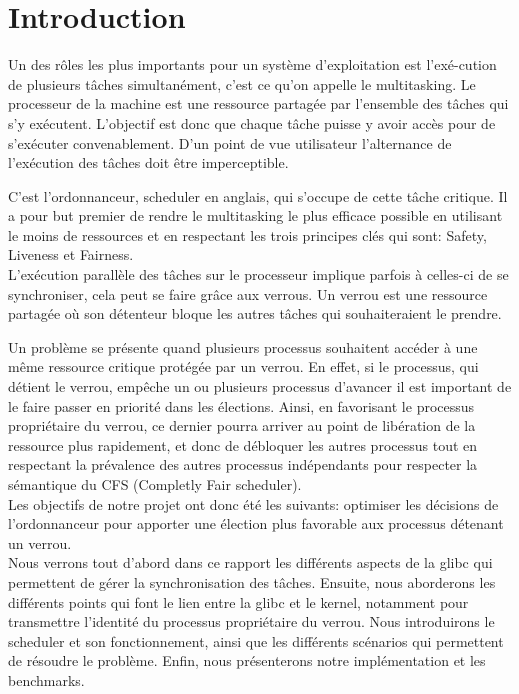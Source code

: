 \section{Introduction}

Un des rôles les plus importants pour un système d'exploitation est
l'exé-cution de plusieurs tâches simultanément, c'est ce qu'on
appelle le multitasking. Le processeur de la machine est une ressource
partagée par l'ensemble des tâches qui s'y exécutent. L'objectif est donc
que chaque tâche puisse y avoir accès pour de s'exécuter 
convenablement. D'un point de vue utilisateur l'alternance de l'exécution
des tâches doit être imperceptible.

C'est l'ordonnanceur, scheduler en anglais, qui s'occupe de cette tâche
critique. Il a pour but premier de rendre le multitasking le plus efficace
possible en utilisant le moins de ressources et en respectant les trois principes
clés qui sont: Safety, Liveness et Fairness.
\\

L'exécution parallèle des tâches sur le processeur implique parfois à celles-ci
de se synchroniser, cela peut se faire grâce aux verrous. Un verrou est une
ressource partagée où son détenteur bloque les autres tâches qui
souhaiteraient le prendre. 

Un problème se présente quand plusieurs processus souhaitent accéder à une même
ressource critique protégée par un verrou. 
En effet, si le processus, qui détient le verrou, empêche un ou plusieurs processus 
d'avancer il est important de le faire passer en priorité dans les 
élections. Ainsi, en favorisant le processus propriétaire du verrou, ce dernier 
pourra arriver au point de libération de la ressource plus rapidement, et donc de 
débloquer les autres processus tout en respectant la prévalence des autres processus 
indépendants pour respecter la sémantique du CFS (Completly Fair scheduler).
\\

Les objectifs de notre projet ont donc été les suivants: optimiser les
décisions de l'ordonnanceur pour apporter une élection plus favorable aux
processus détenant un verrou.
\\


Nous verrons tout d'abord dans ce rapport les différents aspects de la glibc
qui permettent de gérer la synchronisation des tâches. Ensuite, nous aborderons
les différents points qui font le lien entre la glibc et le kernel, notamment
pour transmettre l'identité du processus propriétaire du verrou. Nous introduirons
le scheduler et son fonctionnement, ainsi que les différents scénarios qui permettent
de résoudre le problème. Enfin, nous présenterons notre implémentation et les
benchmarks.
